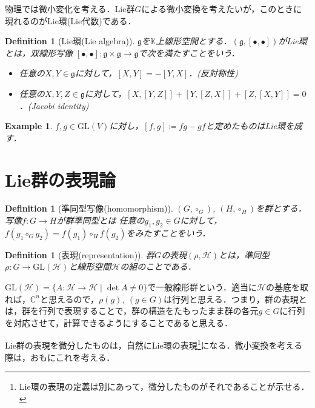 \documentclass[dvipdfmx, a4paper, english]{jsarticle}
\theoremstyle{break}
\newtheorem{defn}[thm]{Definition}
\newtheorem{eg}[thm]{Example}
\newcommand{\C}{\mathbb{C}}
\newcommand{\hilb}{\mathcal{H}}
\newcommand{\GL}{\mathrm{GL}}
\newcommand{\g}{\mathfrak{g}}
\numberwithin{equation}{section}
\begin{document}
	物理では微小変化を考える．Lie群$G$による微小変換を考えたいが，このときに現れるのがLie環(Lie代数)である．

	\begin{defn}[Lie環(Lie algebra)]
			$\g$を$\mathbb{K}$上線形空間とする．$(\g, [\bullet, \bullet])$がLie環とは，双線形写像
			$[\bullet, \bullet]\colon \g \times \g \to \g$で次を満たすことをいう．
			\begin{itemize}
					\item 任意の$X, Y\in \g$に対して，$[X, Y] = - [Y, X]$．(反対称性)
					\item 任意の$X, Y, Z \in \g$に対して，$[X,[Y, Z]] + [Y, [Z, X]] + [Z, [X, Y]] = 0$．(Jacobi identity)
			\end{itemize}
	\end{defn}

	\begin{eg}
			$f, g\in \GL(V)$に対し，$[f, g] \coloneqq fg - gf$と定めたものはLie環を成す．
	\end{eg}

	\section{Lie群の表現論}

	\begin{defn}[準同型写像(homomorphism)]
			$(G, \circ_G)$, $(H, \circ_{H})$を群とする．写像$f \colon G \to H$が群準同型とは
			任意の$g_1, g_2 \in G$に対して，$f(g_1\circ_{G}g_2) = f(g_1)\circ_Hf(g_2)$をみたすことをいう．
	\end{defn}
	
	\begin{defn}[表現(representation)]
			群$G$の表現$(\rho , \hilb)$とは，準同型$\rho\colon G\to \GL(\hilb)$と線形空間$\hilb$の組のことである．
	\end{defn}

	$\GL(\hilb) = \{A\colon \hilb \to \hilb\mid\det A \neq 0\}$で一般線形群という．適当に$\hilb$の基底を取れば，$\C^n$と思えるので，$\rho(g),\ (g\in G)$は行列と思える．つまり，群の表現とは，群を行列で表現することで，群の構造をたもったまま群の各元$g\in G$に行列を対応させて，計算できるようにすることであると思える．

	Lie群の表現を微分したものは，自然にLie環の表現\footnote{Lie環の表現の定義は別にあって，微分したものがそれであることが示せる．\cite{Yanagida:2020}}になる．微小変換を考える際は，おもにこれを考える．
\end{document}
